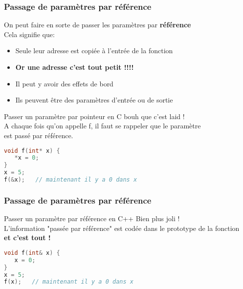 \documentclass{beamer}
\begin{document}
\begin{frame}[fragile=singleslide,shrink=20]
\frametitle{Passage de paramètres par référence}
On peut faire en sorte de passer les paramètres par \textbf{référence} \\
Cela signifie que:
\begin{itemize}
\item{Seule leur adresse est copiée à l'entrée de la fonction}
\item{\textbf{Or une adresse c'est tout petit !!!!}}
\item{Il peut y avoir des effets de bord}
\item{Ils peuvent être des paramètres d'entrée ou de sortie}
\end{itemize}

\begin{block}{Passer un paramètre par pointeur en C}
bouh que c'est laid ! \\
A chaque fois qu'on appelle f, il faut se rappeler que le paramètre \\
est passé par référence.
\begin{lstlisting}[language=c++]
void f(int* x) {
   *x = 0;
}
x = 5;
f(&x);   // maintenant il y a 0 dans x
\end{lstlisting}
\end{block}
\end{frame}

\begin{frame}[fragile=singleslide,shrink=20]
\frametitle{Passage de paramètres par référence}
\begin{block}{Passer un paramètre par référence en C++}
Bien plus joli ! \\
L'information "passée par référence" est codée dans le prototype de la fonction \\
\textbf{et c'est tout !}
\begin{lstlisting}[language=c++]
void f(int& x) {
   x = 0;
}
x = 5;
f(x);   // maintenant il y a 0 dans x
\end{lstlisting}
\end{block}
\end{frame}
\end{document}
